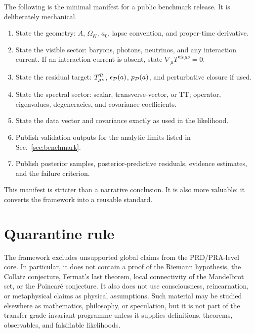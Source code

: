 \documentclass[
  aps,
  prd,
  reprint,
  superscriptaddress,
  nofootinbib,
  floatfix,
  longbibliography
]{revtex4-2}
\newcommand{\vis}{\mathrm{vis}}
\begin{document}
The following is the minimal manifest for a public benchmark release.
It is deliberately mechanical.
\begin{enumerate}
\item State the geometry: \(A\), \(\Omega_K\), \(a_0\), lapse convention,
      and proper-time derivative.
\item State the visible sector: baryons, photons, neutrinos, and any
      interaction current.  If an interaction current is absent, state
      \(\nabla_\mu T^{\vis\,\mu\nu}=0\).
\item State the residual target: \(T^{\cal D}_{\mu\nu}\),
      \(\epsilon_{\cal D}(a)\), \(p_{\cal D}(a)\), and perturbative
      closure if used.
\item State the spectral sector: scalar, transverse-vector, or TT;
      operator, eigenvalues, degeneracies, and covariance coefficients.
\item State the data vector and covariance exactly as used in the
      likelihood.
\item Publish validation outputs for the analytic limits listed in
      Sec.~\ref{sec:benchmark}.
\item Publish posterior samples, posterior-predictive residuals,
      evidence estimates, and the failure criterion.
\end{enumerate}
This manifest is stricter than a narrative conclusion.  It is also more
valuable: it converts the framework into a reusable standard.

\section{Quarantine rule}
\label{app:quarantine}

The framework excludes unsupported global claims from the PRD/PRA-level
core.  In particular, it does not contain a proof of the Riemann
hypothesis, the Collatz conjecture, Fermat's last theorem, local
connectivity of the Mandelbrot set, or the Poincaré conjecture.  It also
does not use consciousness, reincarnation, or metaphysical claims as
physical assumptions.  Such material may be studied elsewhere as
mathematics, philosophy, or speculation, but it is not part of the
transfer-grade invariant programme unless it supplies definitions,
theorems, observables, and falsifiable likelihoods.
\end{document}
